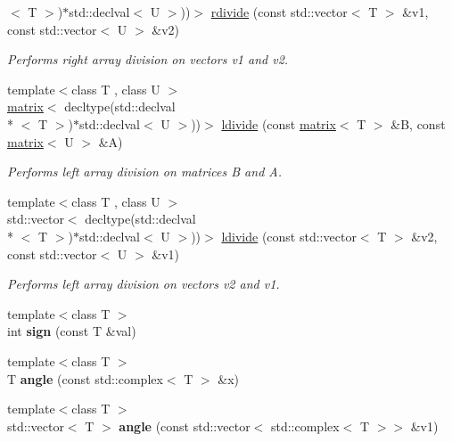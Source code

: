 \begin{DoxyCompactItemize}
$<$ T $>$)$\ast$std\-::declval$<$ U $>$))$>$ \hyperlink{namespacekeycpp_af234cd07a4e1d649629a6b83dbe113ff}{rdivide} (const std\-::vector$<$ T $>$ \&v1, const std\-::vector$<$ U $>$ \&v2)
\begin{DoxyCompactList}\small\item\em Performs right array division on vectors v1 and v2. \end{DoxyCompactList}\item 
{\footnotesize template$<$class T , class U $>$ }\\\hyperlink{classkeycpp_1_1matrix}{matrix}$<$ decltype(std\-::declval\\*
$<$ T $>$)$\ast$std\-::declval$<$ U $>$))$>$ \hyperlink{namespacekeycpp_ac57d32902cba2c399475015235aeccec}{ldivide} (const \hyperlink{classkeycpp_1_1matrix}{matrix}$<$ T $>$ \&B, const \hyperlink{classkeycpp_1_1matrix}{matrix}$<$ U $>$ \&A)
\begin{DoxyCompactList}\small\item\em Performs left array division on matrices B and A. \end{DoxyCompactList}\item 
{\footnotesize template$<$class T , class U $>$ }\\std\-::vector$<$ decltype(std\-::declval\\*
$<$ T $>$)$\ast$std\-::declval$<$ U $>$))$>$ \hyperlink{namespacekeycpp_a7a86bc7e25833cdf9266c038a4edb0ea}{ldivide} (const std\-::vector$<$ T $>$ \&v2, const std\-::vector$<$ U $>$ \&v1)
\begin{DoxyCompactList}\small\item\em Performs left array division on vectors v2 and v1. \end{DoxyCompactList}\item 
\hypertarget{namespacekeycpp_a87f2917e6a7c8e20d010aea0d8480668}{{\footnotesize template$<$class T $>$ }\\int {\bfseries sign} (const T \&val)}\label{namespacekeycpp_a87f2917e6a7c8e20d010aea0d8480668}

\item 
\hypertarget{namespacekeycpp_aaa2e17334911e8a447a5ef6c0cc54c3f}{{\footnotesize template$<$class T $>$ }\\T {\bfseries angle} (const std\-::complex$<$ T $>$ \&x)}\label{namespacekeycpp_aaa2e17334911e8a447a5ef6c0cc54c3f}

\item 
\hypertarget{namespacekeycpp_a9aed8b7c5c058bda28186010d2f3833f}{{\footnotesize template$<$class T $>$ }\\std\-::vector$<$ T $>$ {\bfseries angle} (const std\-::vector$<$ std\-::complex$<$ T $>$$>$ \&v1)}\label{namespacekeycpp_a9aed8b7c5c058bda28186010d2f3833f}


\end{DoxyCompactItemize}
